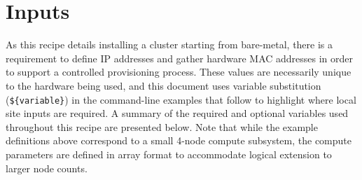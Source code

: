 
\section{Inputs} \label{sec:inputs}
As this recipe details installing a cluster starting from bare-metal, there is a requirement to define IP addresses and
gather hardware MAC addresses in order to support a controlled provisioning process. These values are necessarily unique
to the hardware being used, and this document uses variable substitution (\texttt{\$\{variable\}}) in the command-line
examples that follow to highlight where local site inputs are required. A summary of the required and optional variables
used throughout this recipe are presented below. Note that while the example definitions above correspond to a small
4-node compute subsystem, the compute parameters are defined in array format to accommodate logical extension to larger
node counts. \\

